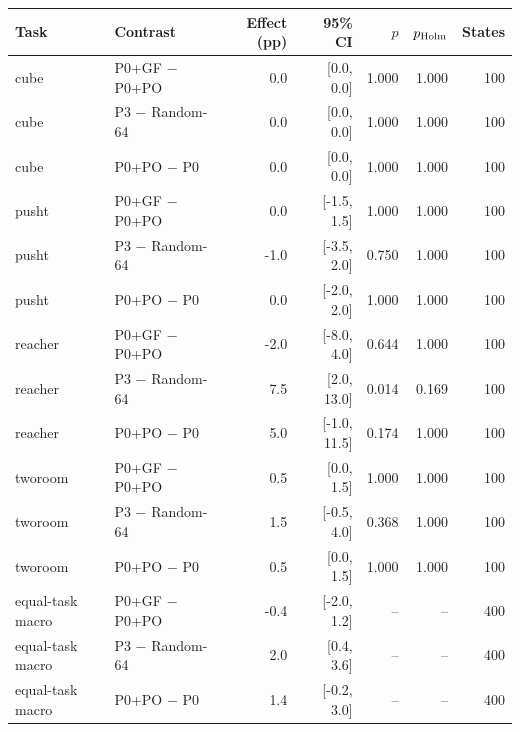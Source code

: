 \begin{tabular}{llrrrrr}
\toprule
Task & Contrast & Effect (pp) & 95\% CI & $p$ & $p_{\rm Holm}$ & States \\
\midrule
cube & P0+GF $-$ P0+PO & 0.0 & [0.0, 0.0] & 1.000 & 1.000 & 100 \\
cube & P3 $-$ Random-64 & 0.0 & [0.0, 0.0] & 1.000 & 1.000 & 100 \\
cube & P0+PO $-$ P0 & 0.0 & [0.0, 0.0] & 1.000 & 1.000 & 100 \\
pusht & P0+GF $-$ P0+PO & 0.0 & [-1.5, 1.5] & 1.000 & 1.000 & 100 \\
pusht & P3 $-$ Random-64 & -1.0 & [-3.5, 2.0] & 0.750 & 1.000 & 100 \\
pusht & P0+PO $-$ P0 & 0.0 & [-2.0, 2.0] & 1.000 & 1.000 & 100 \\
reacher & P0+GF $-$ P0+PO & -2.0 & [-8.0, 4.0] & 0.644 & 1.000 & 100 \\
reacher & P3 $-$ Random-64 & 7.5 & [2.0, 13.0] & 0.014 & 0.169 & 100 \\
reacher & P0+PO $-$ P0 & 5.0 & [-1.0, 11.5] & 0.174 & 1.000 & 100 \\
tworoom & P0+GF $-$ P0+PO & 0.5 & [0.0, 1.5] & 1.000 & 1.000 & 100 \\
tworoom & P3 $-$ Random-64 & 1.5 & [-0.5, 4.0] & 0.368 & 1.000 & 100 \\
tworoom & P0+PO $-$ P0 & 0.5 & [0.0, 1.5] & 1.000 & 1.000 & 100 \\
equal-task macro & P0+GF $-$ P0+PO & -0.4 & [-2.0, 1.2] & -- & -- & 400 \\
equal-task macro & P3 $-$ Random-64 & 2.0 & [0.4, 3.6] & -- & -- & 400 \\
equal-task macro & P0+PO $-$ P0 & 1.4 & [-0.2, 3.0] & -- & -- & 400 \\
\bottomrule
\end{tabular}
